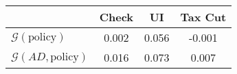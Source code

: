 \begin{tabular}{@{}lccc@{}} 
\toprule 
                          & Check      & UI    & Tax Cut    \\  \midrule 
$\mathcal{G}(\text{policy})$ & 0.002  & 0.056  & -0.001     \\ 
$\mathcal{G}(AD,\text{policy})$ & 0.016  & 0.073  & 0.007     \\ 
\end{tabular}  
